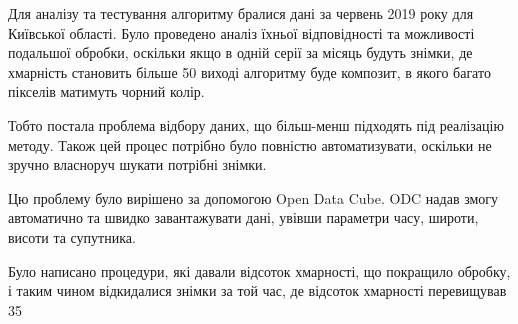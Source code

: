 Для аналізу та тестування алгоритму бралися дані за червень 2019 року
для Київської області. Було проведено аналіз їхньої
відповідності та можливості подальшої обробки, оскільки якщо в одній
серії за місяць будуть знімки, де хмарність становить більше 50%
виході алгоритму буде композит, в якого багато пікселів матимуть
чорний колір.

Тобто постала проблема відбору даних, що більш-менш підходять під
реалізацію методу. Також цей процес потрібно було повністю
автоматизувати, оскільки не зручно власноруч шукати потрібні знімки.

Цю проблему було вирішено за допомогою Open Data
Cube. ODC надав змогу автоматично та швидко завантажувати дані,
увівши параметри часу, широти, висоти та супутника.

Було написано процедури, які давали відсоток хмарності, що покращило
обробку, і таким чином відкидалися знімки за той час, де відсоток хмарності
перевищував 35%
